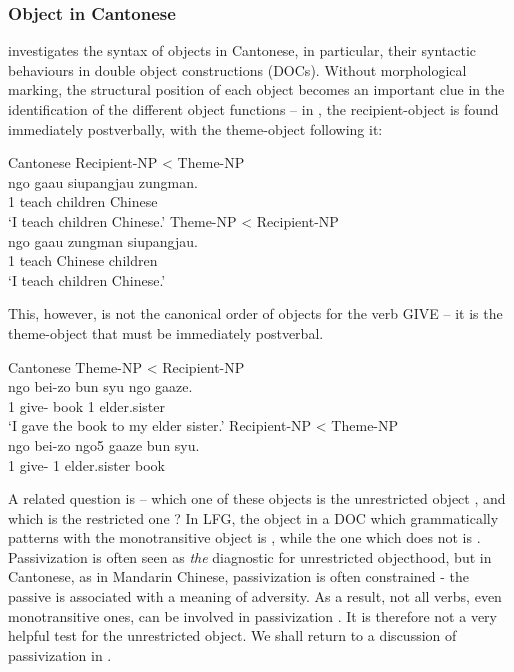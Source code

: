 \documentclass[output=paper,chinesefont,hidelinks]{langscibook}
\begin{document}
\subsubsection{Object in Cantonese}
\label{sec:Sinitic:3.1.2.2}

\citet{Lam2008} investigates the syntax of objects in Cantonese, in particular, their syntactic behaviours in double object constructions (DOCs). Without morphological marking, the structural position of each object becomes an important clue in the identification of the different object functions – in , the recipient-object is found immediately postverbally, with the theme-object following it:

\newpage
\ea%
    \label{ex:Sinitic:18} Cantonese
    \ea Recipient-NP < Theme-NP\\
    \gll ngo  gaau  siupangjau  zungman.\\
         {1\SG}  teach  children  Chinese\\
    \glt `I teach children Chinese.'
    \ex  *Theme-NP < Recipient-NP\\
    \gll *ngo  gaau  zungman  siupangjau.\\
         {1\SG}  teach  Chinese   children\\
    \glt `I teach children Chinese.'
    \z\z

This, however, is not the canonical order of objects for the verb GIVE – it is the theme-object that must be immediately postverbal.

\ea%
    \label{ex:Sinitic:19} Cantonese
    \ea Theme-NP < Recipient-NP\\
    \gll ngo      bei-zo    bun  syu  ngo  gaaze.\\
         {1\SG} give-{\PFV}  {\CLF}  book   {1\SG}   elder.sister\\
    \glt `I gave the book to my elder sister.'
    \ex  *Recipient-NP < Theme-NP\\
    \gll *ngo     bei-zo          ngo5      gaaze    bun  syu.\\
        {1\SG}   give-{\PFV}   {1\SG}     elder.sister   {\CLF}    book\\
    \z\z

A related question is – which one of these objects is the unrestricted object {\OBJ}, and which is the restricted one {\OBJTHETA}?  In LFG, the object in a DOC which grammatically patterns with the monotransitive object is {\OBJ}, while the one which does not is {\OBJTHETA}. Passivization is often seen as \textit{the} diagnostic for unrestricted objecthood, but in Cantonese, as in Mandarin Chinese, passivization is often constrained - the passive is associated with a meaning of adversity. As a result, not all verbs, even monotransitive ones, can be involved in passivization . It is therefore not a very helpful test for the unrestricted object. We shall return to a discussion of passivization in .
\end{document}
